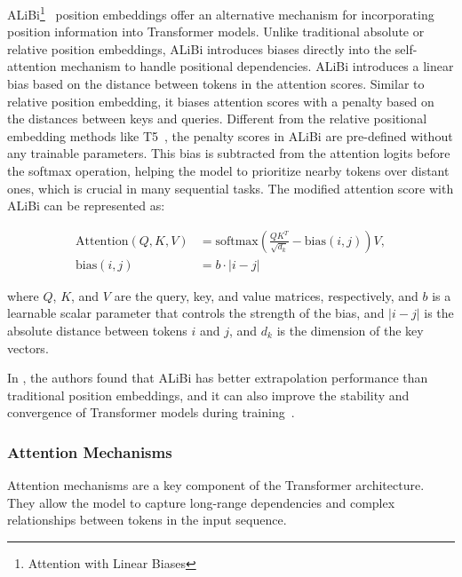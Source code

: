 ALiBi\footnote{Attention with Linear Biases}~\cite{press2022train} position embeddings offer an alternative mechanism for incorporating position information into Transformer models.
Unlike traditional absolute or relative position embeddings, ALiBi introduces biases directly into the self-attention mechanism to handle positional dependencies.
ALiBi introduces a linear bias based on the distance between tokens in the attention scores.
Similar to relative position embedding, it biases attention scores with a penalty based on the distances between keys and queries.
Different from the relative positional embedding methods like T5~\cite{zeng2021pangu}, the penalty scores in ALiBi are pre-defined without any trainable parameters.
This bias is subtracted from the attention logits before the softmax operation, helping the model to prioritize nearby tokens over distant ones, which is crucial in many sequential tasks.
The modified attention score with ALiBi can be represented as:

\begin{equation}
	\begin{aligned}
		\text{Attention}(Q, K, V) & = \text{softmax}\left(\frac{QK^T}{\sqrt{d_k}} - \text{bias}(i,j)\right)V, \\
		\text{bias}(i,j)          & = b \cdotp |i-j|
	\end{aligned}
	\label{eq:alibi}
\end{equation}

\noindent where \(Q\), \(K\), and \(V\) are the query, key, and value matrices, respectively, and \(b\) is a learnable scalar parameter that controls the strength of the bias, and \(|i-j|\) is the absolute distance between tokens \(i\) and \(j\), and \(d_k\) is the dimension of the key vectors.

In \textcite{press2022train}, the authors found that ALiBi has better extrapolation performance than traditional position embeddings, and it can also improve the stability and convergence of Transformer models during training~\cite{workshop2023bloom}.

\subsubsection{Attention Mechanisms}
\label{subsubsec:attention-mechanisms}

Attention mechanisms are a key component of the Transformer architecture. They allow the model to capture long-range dependencies and complex relationships between tokens in the input sequence.

